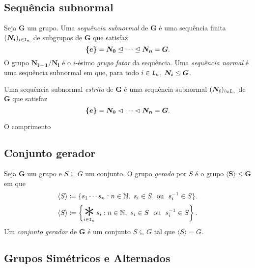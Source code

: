 \subsection{Sequência subnormal}

\begin{defi}
Seja $\bm G$ um grupo. Uma \emph{sequência subnormal} de $\bm G$ é uma sequência finita $(\bm{N_i})_{i \in \mathtt I_n}$ de subgrupos de $\bm G$ que satisfaz
	\begin{equation*}
	\bm{\{e\}} = \bm{N_0} \mathrel{\unlhd} \cdots \mathrel{\unlhd} \bm{N_n} = \bm G.
	\end{equation*}
O grupo $\bm{N_{i+1}/N_i}$ é o $i$-ésimo \emph{grupo fator} da sequência.
Uma \emph{sequência normal} é uma sequência subnormal em que, para todo $i \in \mathtt I_n$, $\bm{N_i} \mathrel{\unlhd} \bm G$.

Uma sequência subnormal \emph{estrita} de $\bm G$ é uma sequência subnormal $(\bm{N_i})_{i \in \mathtt I_n}$ de $\bm G$ que satisfaz
	\begin{equation*}
	\bm{\{e\}} = \bm{N_0} \mathrel{\lhd} \cdots \mathrel{\lhd} \bm{N_n} = \bm G.
	\end{equation*}
	
O comprimento
\end{defi}



\subsection{Conjunto gerador}

\begin{defi}
Seja $\bm G$ um grupo e $S \subseteq G$ um conjunto. O grupo \emph{gerado} por $S$ é o grupo $\bm{\langle S \rangle} \leq \bm G$ em que
	\begin{equation*}
	\langle S \rangle \coloneqq \{s_1 \cdots s_n : n \in \N,\ s_i \in S \ou s_i\inv \in S\}.
	\end{equation*}
	\begin{equation*}
	\langle S \rangle \coloneqq \left\{\bigopb_{i \in \inte_n} s_i : n \in \N,\ s_i \in S \ou s_i\inv \in S\right\}.
	\end{equation*}
\noindent
Um \emph{conjunto gerador} de $\bm G$ é um conjunto $S \subseteq G$ tal que $\langle S \rangle = G$.
\end{defi}










\subsection{Grupos Simétricos e Alternados}

